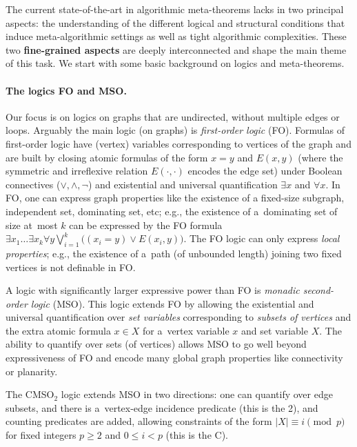 \documentclass[a4paper,11pt]{article}
\newcommand{\fo}{\textsf{FO}\xspace}
\newcommand{\mso}{\textsf{MSO}\xspace}
\newcommand{\cmsot}{\textsf{CMSO$_2$}\xspace}
\begin{document}
The current state-of-the-art in algorithmic meta-theorems lacks in two principal aspects: the understanding of the different logical and structural conditions that induce meta-algorithmic settings as well as tight algorithmic complexities. These two \textbf{fine-grained aspects} are deeply interconnected and shape the main theme of this task. We start with some basic background on logics and meta-theorems. 


\paragraph{The logics \fo and \mso.}
Our focus is on logics on graphs that are undirected, without multiple edges or loops.
Arguably the main logic (on graphs) is \emph{first-order logic} (\fo).
Formulas of first-order logic have (vertex) variables corresponding to vertices of the graph and are built by closing atomic formulas of the form $x=y$ and $E(x,y)$ (where the symmetric and irreflexive relation $E(\cdot,\cdot)$ encodes the edge set) under Boolean connectives ($\lor,\land,\neg$) and existential and universal quantification $\exists x$ and $\forall x$.
In \fo, one can express graph properties like the existence of a fixed-size subgraph, independent set, dominating set, etc; e.g., the existence of a~dominating set of size at~most $k$ can be expressed by the \fo formula $\exists x_1 \ldots \exists x_k \forall y \bigvee_{i=1}^k \big((x_i=y)\lor E(x_i,y)\big)$.
The \fo logic can only express \emph{local properties}; e.g., the existence of a~path (of unbounded length) joining two fixed vertices is not definable in \fo.
    
A logic with significantly larger expressive power than \fo is \emph{monadic second-order logic} (\mso).
This logic extends \fo by allowing the existential and universal quantification over \emph{set variables} corresponding to \emph{subsets of vertices} and the extra atomic formula $x \in X$ for a~vertex variable $x$ and set variable $X$.
The ability to quantify over sets (of vertices) allows \mso to go well beyond expressiveness of \fo and encode many global graph properties like connectivity or planarity.

The \cmsot logic extends \mso in two directions: one can quantify over edge subsets, and there is a~vertex-edge incidence predicate (this is the 2), and counting predicates are added, allowing constraints of the form $|X| \equiv i \pmod p$ for fixed integers $p \geqslant 2$ and $0 \leqslant i < p$ (this is the \textsf{C}). 
\end{document}
